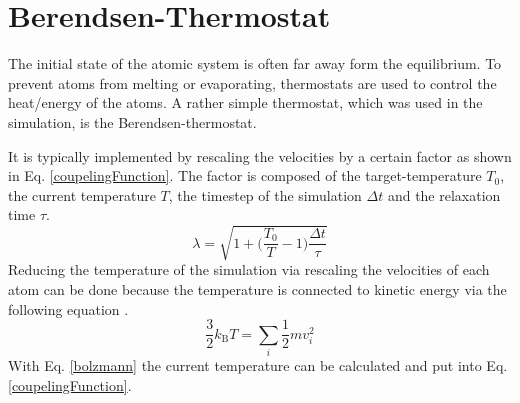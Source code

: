 \section{Berendsen-Thermostat}
\begin{comment}
- couple the moleclular system to a larger heat bath
- thermostat controls the heat of the simulation so the system does not melt or evaporate
\end{comment}
The initial state of the atomic system is often far away form the equilibrium. To prevent atoms from melting or evaporating, thermostats are used to control the heat/energy of the atoms. A rather simple thermostat, which was used in the simulation, is the Berendsen-thermostat. 
\par
It is typically implemented by rescaling the velocities by a certain factor as shown in Eq.  \ref{coupelingFunction}. The factor is composed of the target-temperature $T_{0}$, the current temperature $T$, the timestep of the simulation $\Delta{t}$ and the relaxation time $\tau$. 
\begin{equation}
	\label{coupelingFunction}
	\lambda = \sqrt{1 + \bigg(\frac{T_{0}}{T} -1\bigg)\frac{\Delta t}{\tau}}
\end{equation}
Reducing the temperature of the simulation via rescaling the velocities of each atom can be done because the temperature is connected to kinetic energy via the following equation \cite[cf.][]{molDymCourse}. 
\begin{equation}
	\label{bolzmann}
	\frac{3}{2} k_{\mathrm{B}} T = \sum_{i} \frac{1}{2} m v_{i}^2
\end{equation}
With Eq. \ref{bolzmann} the current temperature can be calculated and put into Eq. \ref{coupelingFunction}.


